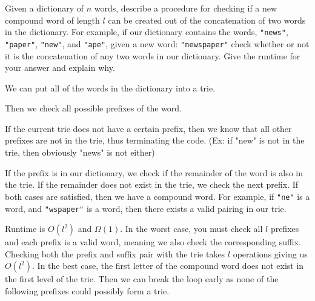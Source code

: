 \begin{blocksection}
\question Given a dictionary of $n$ words, describe a procedure for checking if a
new compound word of length $l$ can be created out of the concatenation of two words in the
dictionary. For example, if our dictionary contains the words,
\lstinline$"news"$, \lstinline$"paper"$, \lstinline$"new"$, and
\lstinline$"ape"$, given a new word:
\lstinline$"newspaper"$ check whether or not it is the concatenation of any two words in our dictionary. Give the runtime for your answer and explain why.

\begin{solution}[1in]
We can put all of the words in the dictionary into a trie. 

Then we check all possible prefixes of the word. 

If the current trie does not have a certain prefix, then we know that all other prefixes are not in the trie, thus terminating the code. (Ex: if "new" is not in the trie, then obviously "news" is not either)

If the prefix is in our dictionary, we check if the remainder of the word is also in the trie. If the remainder does not exist in the trie, we check the next prefix. If both cases are satisfied, then we have a compound word. For example, if \lstinline$"ne"$ is a word, and \lstinline$"wspaper"$ is a word, then there exists a valid pairing in our trie.

Runtime is $O(l^2)$ and $\Omega(1)$. In the worst case, you must check all $l$ prefixes and each prefix is a valid word, meaning we also check the corresponding suffix. Checking both the prefix and suffix pair with the trie takes $l$ operations giving us $O(l^2)$. In the best case, the first letter of the compound word does not exist in the first level of the trie. Then we can break the loop early as none of the following prefixes could possibly form a trie.




\end{solution}
\end{blocksection}
